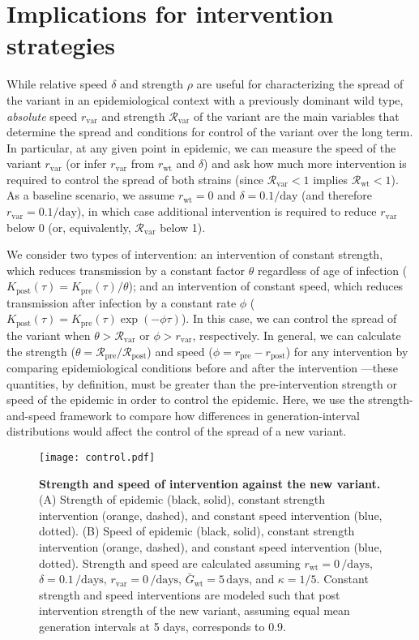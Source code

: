 \documentclass[12pt]{article}
\newcommand{\vvvar}{\mathrm{var}}
\newcommand{\wwwt}{\mathrm{wt}}
\newcommand{\rx}[1]{\ensuremath{{r}_{#1}}\xspace}
\newcommand{\ry}[1]{\rx{\mathrm{#1}}}
\newcommand{\rw}{\rx{\wwwt}}
\newcommand{\rv}{\rx{\vvvar}}
\newcommand{\Rx}[1]{\ensuremath{{\mathcal R}_{#1}}\xspace}
\newcommand{\Ry}[1]{\Rx{\mathrm{#1}}}
\newcommand{\Rw}{\Rx{\wwwt}}
\newcommand{\Rv}{\Rx{\vvvar}}
\newcommand{\pday}{\ensuremath{/\textrm{day}}}
\newcommand{\Gx}[1]{\ensuremath{{\bar G}_{#1}}\xspace}
\newcommand{\Gy}[1]{\Gx{\mathrm{#1}}}
\begin{document}
\section{Implications for intervention strategies}

While relative speed $\delta$ and strength $\rho$ are useful for characterizing the spread of the variant in an epidemiological context with a previously dominant wild type, \emph{absolute} speed $\rv$ and strength $\Rv$ of the variant are the main variables that determine the spread and conditions for control of the variant over the long term.
In particular, at any given point in epidemic, we can measure the speed of the variant $\rv$ (or infer $\rv$ from $\rw$ and $\delta$) and ask how much more intervention is required to control the spread of both strains (since $\Rv < 1$ implies $\Rw < 1$).
As a baseline scenario, we assume $\rw=0$ and $\delta=0.1\pday$ (and therefore $\rv=0.1\pday$), in which case additional intervention is required to reduce $\rv$ below 0 (or, equivalently, $\Rv$ below 1).

We consider two types of intervention:
an intervention of constant strength, which reduces transmission by a constant factor $\theta$ regardless of age of infection ($K_{\mathrm{post}}(\tau) = K_{\mathrm{pre}}(\tau)/\theta$); and an intervention of constant speed, which reduces transmission after infection by a constant rate $\phi$ ($K_{\mathrm{post}}(\tau) = K_{\mathrm{pre}}(\tau) \exp(-\phi \tau)$).
In this case, we can control the spread of the variant when $\theta > \Rv$ or $\phi > \rv$, respectively.
In general, we can calculate the strength ($\theta = \Ry{pre}/\Ry{post}$) and speed ($\phi = \ry{pre} - \ry{post}$) for any intervention by comparing epidemiological conditions before and after the intervention \citep{doi:10.1098/rspb.2020.1556}---these quantities, by definition, must be greater than the pre-intervention strength or speed of the epidemic in order to control the epidemic.
Here, we use the strength-and-speed framework to compare how differences in generation-interval distributions would affect the control of the spread of a new variant.

\begin{figure}[!th]
\texttt{[image: control.pdf]}
\caption{
\textbf{Strength and speed of intervention against the new variant.}
(A) Strength of epidemic (black, solid), constant strength intervention (orange, dashed), and constant speed intervention (blue, dotted).
(B) Speed of epidemic (black, solid), constant strength intervention (orange, dashed), and constant speed intervention (blue, dotted).
Strength and speed are calculated assuming $\rw=0\,\textrm{/days}$, $\delta=0.1\,\textrm{/days}$, $\rv=0\,\textrm{/days}$, $\Gy{wt}=5\,\textrm{days}$, and $\kappa=1/5$.
Constant strength and speed interventions are modeled such that post intervention strength of the new variant, assuming equal mean generation intervals at 5 days, corresponds to 0.9.
}
\label{fig:strengthspeed}
\end{figure}
\end{document}
